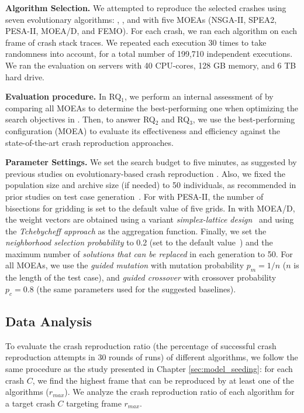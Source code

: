 \textbf{Algorithm Selection. }
We attempted to reproduce the selected crashes using seven evolutionary algorithms: \SGGA, \decomposition,
and \moho with  five MOEAs (NSGA-II, SPEA2, PESA-II, MOEA/D, and FEMO). 
For each crash, we ran each algorithm on each frame of crash stack traces. We repeated each execution 30 times to take randomness into account, for a total number of 199,710 independent executions.
We ran the evaluation on servers with 40 CPU-cores, 128 GB memory, and 6 TB hard drive.

\textbf{Evaluation procedure. }
In RQ$_1$, %
we perform an internal assessment of \moho by comparing all MOEAs to determine the best-performing one when optimizing the search objectives in \moho. Then, to answer RQ$_2$ and RQ$_3$, we use the best-performing \moho configuration (MOEA) to evaluate its effectiveness and efficiency against the state-of-the-art crash reproduction approaches. 

\textbf{Parameter Settings. }
We set the search budget to five minutes, as suggested by previous studies on evolutionary-based crash reproduction \cite{Soltani2018a}. Also, we fixed the population size and archive size (if needed) to 50 individuals, as recommended in prior studies on test case generation~\cite{Panichella2018}. For \moho with PESA-II, the number of bisections for gridding is set to the default value of five grids.
In \moho with MOEA/D, the weight vectors are obtained using a variant \textit{simplex-lattice design}~\cite{tan2012modification} and using the \textit{Tchebycheff approach} as the aggregation function. Finally, we set the \textit{neighborhood selection probability} to 0.2 (set to the default value~\cite{durillo2010jmetal}) and the maximum number of \textit{solutions that can be replaced} in each generation to 50. For all MOEAs, we use the 
\textit{guided mutation} with mutation probability $p_m=1/n$ ($n$ is the length of the test case), and  
\textit{guided crossover} with crossover probability $p_c=0.8$ (the same parameters used for the suggested baselines). 

\subsection{Data Analysis}

To evaluate the crash reproduction ratio (\ie the percentage of successful crash reproduction attempts in 30 rounds of runs) of different algorithms, we follow the same procedure as the study presented in Chapter \ref{sec:model_seeding}: for each crash $C$, we find the highest frame that can be reproduced by at least one of the algorithms ($r_{max}$). 
We analyze the crash reproduction ratio of each algorithm for a target crash $C$ targeting frame $r_{max}$.

